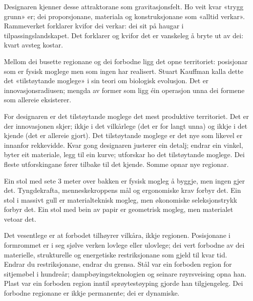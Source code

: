 Designaren kjenner desse attraktorane som gravitasjonsfelt. Ho veit kvar «trygg grunn» er; dei proporsjonane, materiala og konstruksjonane som «alltid verkar». Rammeverket forklarer kvifor dei verkar: dei sit på haugar i tilpassingslandskapet. Det forklarer og kvifor det er vanskeleg å bryte ut av dei: kvart avsteg kostar.


Mellom dei busette regionane og dei forbodne ligg det opne territoriet: posisjonar som er fysisk moglege men som ingen har realisert. Stuart Kauffman kalla dette det «tilstøytande moglege» i sin teori om biologisk evolusjon. Det er innovasjonsradiusen; mengda av former som ligg éin operasjon unna dei formene som allereie eksisterer.

For designaren er det tilstøytande moglege det mest produktive territoriet. Det er der innovasjonen skjer; ikkje i det vilkårlege (det er for langt unna) og ikkje i det kjende (det er allereie gjort). Det tilstøytande moglege er det nye som likevel er innanfor rekkevidde. Kvar gong designaren justerer ein detalj; endrar ein vinkel, byter eit materiale, legg til ein kurve; utforskar ho det tilstøytande moglege. Dei fleste utforskingane fører tilbake til det kjende. Somme opnar nye regionar.


Ein stol med sete 3 meter over bakken er fysisk mogleg å byggje, men ingen gjer det. Tyngdekrafta, menneskekroppens mål og ergonomiske krav forbyr det. Ein stol i massivt gull er materialteknisk mogleg, men økonomiske seleksjonstrykk forbyr det. Ein stol med bein av papir er geometrisk mogleg, men materialet vetoar det.

Det vesentlege er at forbodet tilhøyrer vilkåra, ikkje regionen. Posisjonane i formrommet er i seg sjølve verken lovlege eller ulovlege; dei vert forbodne av dei materielle, strukturelle og energetiske restriksjonane som gjeld til kvar tid. Endrar du restriksjonane, endrar du grensa. Stål var ein forboden region for sitjemøbel i hundreår; dampbøyingsteknologien og seinare røyrsveising opna han. Plast var ein forboden region inntil sprøytestøyping gjorde han tilgjengeleg. Dei forbodne regionane er ikkje permanente; dei er dynamiske.

